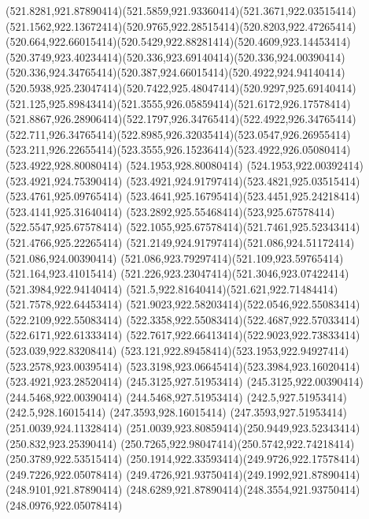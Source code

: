 {{	\curveto(521.8281,921.87890414)(521.5859,921.93360414)(521.3671,922.03515414)
	\curveto(521.1562,922.13672414)(520.9765,922.28515414)(520.8203,922.47265414)
	\curveto(520.664,922.66015414)(520.5429,922.88281414)(520.4609,923.14453414)
	\curveto(520.3749,923.40234414)(520.336,923.69140414)(520.336,924.00390414)
	\curveto(520.336,924.34765414)(520.387,924.66015414)(520.4922,924.94140414)
	\curveto(520.5938,925.23047414)(520.7422,925.48047414)(520.9297,925.69140414)
	\curveto(521.125,925.89843414)(521.3555,926.05859414)(521.6172,926.17578414)
	\curveto(521.8867,926.28906414)(522.1797,926.34765414)(522.4922,926.34765414)
	\curveto(522.711,926.34765414)(522.8985,926.32035414)(523.0547,926.26955414)
	\curveto(523.211,926.22655414)(523.3555,926.15236414)(523.4922,926.05080414)
	\lineto(523.4922,928.80080414)
	\lineto(524.1953,928.80080414)
	\lineto(524.1953,922.00392414)
	\closepath
	\moveto(523.4921,924.75390414)
	\curveto(523.4921,924.91797414)(523.4821,925.03515414)(523.4761,925.09765414)
	\curveto(523.4641,925.16795414)(523.4451,925.24218414)(523.4141,925.31640414)
	\curveto(523.2892,925.55468414)(523,925.67578414)(522.5547,925.67578414)
	\curveto(522.1055,925.67578414)(521.7461,925.52343414)(521.4766,925.22265414)
	\curveto(521.2149,924.91797414)(521.086,924.51172414)(521.086,924.00390414)
	\curveto(521.086,923.79297414)(521.109,923.59765414)(521.164,923.41015414)
	\curveto(521.226,923.23047414)(521.3046,923.07422414)(521.3984,922.94140414)
	\curveto(521.5,922.81640414)(521.621,922.71484414)(521.7578,922.64453414)
	\curveto(521.9023,922.58203414)(522.0546,922.55083414)(522.2109,922.55083414)
	\curveto(522.3358,922.55083414)(522.4687,922.57033414)(522.6171,922.61333414)
	\curveto(522.7617,922.66413414)(522.9023,922.73833414)(523.039,922.83208414)
	\curveto(523.121,922.89458414)(523.1953,922.94927414)(523.2578,923.00395414)
	\curveto(523.3198,923.06645414)(523.3984,923.16020414)(523.4921,923.28520414)
	\closepath
	\moveto(245.3125,927.51953414)
	\lineto(245.3125,922.00390414)
	\lineto(244.5468,922.00390414)
	\lineto(244.5468,927.51953414)
	\lineto(242.5,927.51953414)
	\lineto(242.5,928.16015414)
	\lineto(247.3593,928.16015414)
	\lineto(247.3593,927.51953414)
	\closepath
	\moveto(251.0039,924.11328414)
	\curveto(251.0039,923.80859414)(250.9449,923.52343414)(250.832,923.25390414)
	\curveto(250.7265,922.98047414)(250.5742,922.74218414)(250.3789,922.53515414)
	\curveto(250.1914,922.33593414)(249.9726,922.17578414)(249.7226,922.05078414)
	\curveto(249.4726,921.93750414)(249.1992,921.87890414)(248.9101,921.87890414)
	\curveto(248.6289,921.87890414)(248.3554,921.93750414)(248.0976,922.05078414)
}}
